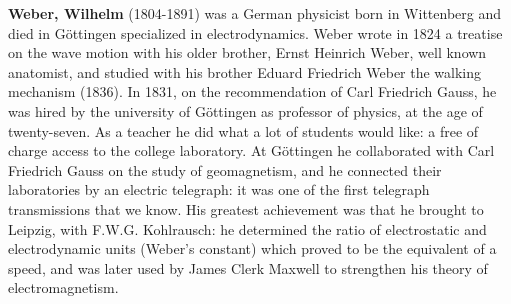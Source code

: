 \textbf{Weber, Wilhelm} (1804-1891) was a German physicist born in  Wittenberg  and died in Göttingen specialized in electrodynamics. Weber wrote in 1824 a treatise on the wave motion with his older brother, Ernst Heinrich Weber, well known anatomist, and studied with his brother Eduard Friedrich Weber the walking mechanism (1836). In 1831, on the recommendation of Carl Friedrich Gauss, he was hired by the university of Göttingen as professor of physics, at the age of twenty-seven. As a teacher he did what a lot of students would like: a free of charge access to the college laboratory. At Göttingen he collaborated with Carl Friedrich Gauss on the study of geomagnetism, and he connected their laboratories by an electric telegraph: it was one of the first telegraph transmissions that we know. His greatest achievement was that he brought to Leipzig, with F.W.G. Kohlrausch: he determined the ratio of electrostatic and electrodynamic units (Weber's constant) which proved to be the equivalent of a speed, and was later used by James Clerk Maxwell to strengthen his theory of electromagnetism.

